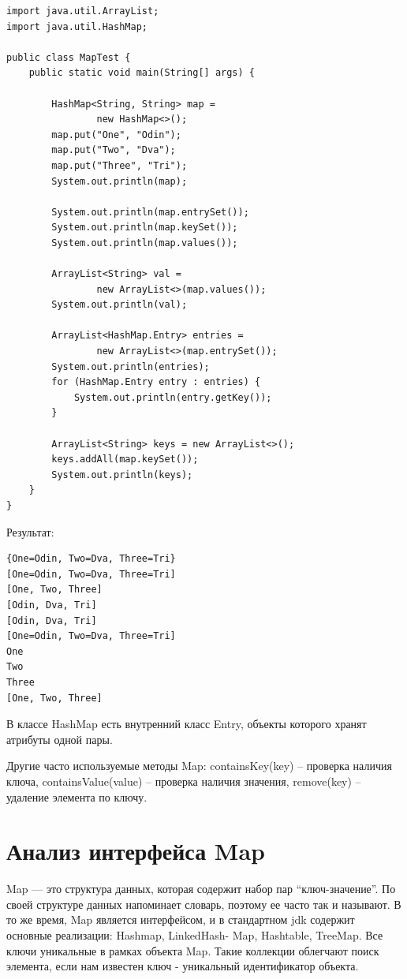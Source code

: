 \begin{lstlisting}
import java.util.ArrayList;
import java.util.HashMap;
 
public class MapTest {
    public static void main(String[] args) {
 
        HashMap<String, String> map =
                new HashMap<>();
        map.put("One", "Odin");
        map.put("Two", "Dva");
        map.put("Three", "Tri");
        System.out.println(map);
 
        System.out.println(map.entrySet());
        System.out.println(map.keySet());
        System.out.println(map.values());
 
        ArrayList<String> val =
                new ArrayList<>(map.values());
        System.out.println(val);
 
        ArrayList<HashMap.Entry> entries =
                new ArrayList<>(map.entrySet());
        System.out.println(entries);
        for (HashMap.Entry entry : entries) {
            System.out.println(entry.getKey());
        }
 
        ArrayList<String> keys = new ArrayList<>();
        keys.addAll(map.keySet());
        System.out.println(keys);
    }
}
\end{lstlisting}

Результат:

\begin{lstlisting}
{One=Odin, Two=Dva, Three=Tri}
[One=Odin, Two=Dva, Three=Tri]
[One, Two, Three]
[Odin, Dva, Tri]
[Odin, Dva, Tri]
[One=Odin, Two=Dva, Three=Tri]
One
Two
Three
[One, Two, Three]
\end{lstlisting}

В классе HashMap есть внутренний класс Entry, объекты которого хранят атрибуты одной пары.

Другие часто используемые методы Map: containsKey(key) – проверка наличия ключа, containsValue(value) – проверка наличия значения, remove(key) – удаление элемента по ключу. %

\section{Анализ интерфейса Map}

Map — это структура данных, которая содержит набор пар “ключ-значение”. По своей структуре данных напоминает словарь, поэтому ее часто так и называют. В то же время, Map является интерфейсом, и в стандартном jdk содержит основные реализации: Hashmap, LinkedHash- \newline Map, Hashtable, TreeMap. Все ключи уникальные в рамках объекта Map. Такие коллекции облегчают поиск элемента, если нам известен ключ - уникальный идентификатор объекта.

